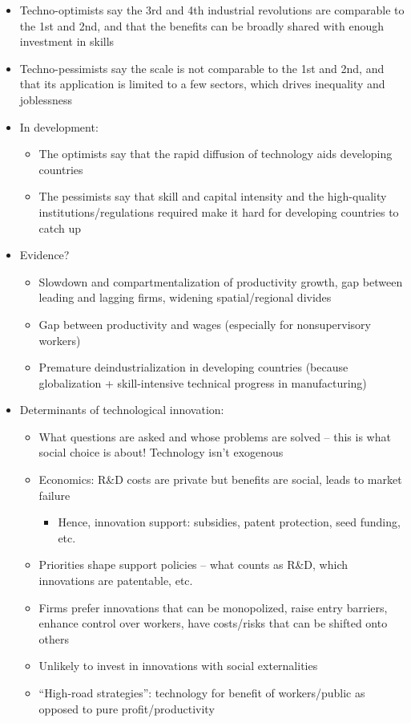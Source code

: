 \begin{itemize}
\tightlist
\item
  Techno-optimists say the 3rd and 4th industrial revolutions are
  comparable to the 1st and 2nd, and that the benefits can be broadly
  shared with enough investment in skills
\item
  Techno-pessimists say the scale is not comparable to the 1st and 2nd,
  and that its application is limited to a few sectors, which drives
  inequality and joblessness
\item
  In development:

  \begin{itemize}
  \tightlist
  \item
    The optimists say that the rapid diffusion of technology aids
    developing countries
  \item
    The pessimists say that skill and capital intensity and the
    high-quality institutions/regulations required make it hard for
    developing countries to catch up
  \end{itemize}
\item
  Evidence?

  \begin{itemize}
  \tightlist
  \item
    Slowdown and compartmentalization of productivity growth, gap
    between leading and lagging firms, widening spatial/regional divides
  \item
    Gap between productivity and wages (especially for nonsupervisory
    workers)
  \item
    Premature deindustrialization in developing countries (because
    globalization + skill-intensive technical progress in manufacturing)
  \end{itemize}
\item
  Determinants of technological innovation:

  \begin{itemize}
  \tightlist
  \item
    What questions are asked and whose problems are solved -- this is
    what social choice is about! Technology isn't exogenous
  \item
    Economics: R\&D costs are private but benefits are social, leads to
    market failure

    \begin{itemize}
    \tightlist
    \item
      Hence, innovation support: subsidies, patent protection, seed
      funding, etc.
    \end{itemize}
  \item
    Priorities shape support policies -- what counts as R\&D, which
    innovations are patentable, etc.
  \item
    Firms prefer innovations that can be monopolized, raise entry
    barriers, enhance control over workers, have costs/risks that can be
    shifted onto others
  \item
    Unlikely to invest in innovations with social externalities
  \item
    ``High-road strategies'': technology for benefit of workers/public
    as opposed to pure profit/productivity


\end{itemize}
\end{itemize}

